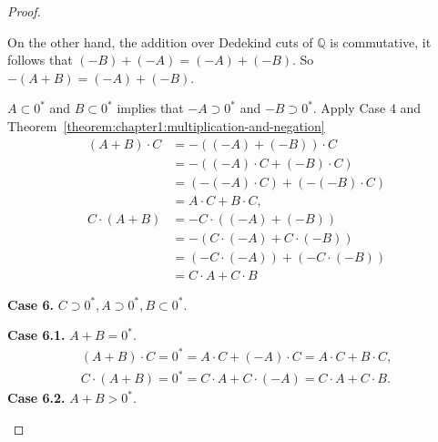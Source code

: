 \begin{proof}
\begin{enumerate}[label={(F\arabic*)}, start=5]
              On the other hand, the addition over Dedekind cuts of $\mathbb{Q}$ is commutative, it follows that $(-B) + (-A) = (-A) + (-B)$. So $-(A + B) = (-A) + (-B)$.

              $A\subset {0}^{*}$ and $B\subset {0}^{*}$ implies that $-A\supset {0}^{*}$ and $-B\supset {0}^{*}$. Apply Case 4 and Theorem~\ref{theorem:chapter1:multiplication-and-negation}
              \begin{align*}
                  (A + B)\cdot C & = -((-A) + (-B))\cdot C           \\
                                 & = -((-A)\cdot C + (-B)\cdot C)    \\
                                 & = (-(-A)\cdot C) + (-(-B)\cdot C) \\
                                 & = A\cdot C + B\cdot C,            \\
                  C\cdot (A + B) & = -C\cdot ((-A) + (-B))           \\
                                 & = -(C\cdot (-A) + C\cdot (-B))    \\
                                 & = (-C\cdot (-A)) + (-C\cdot (-B)) \\
                                 & = C\cdot A + C\cdot B
              \end{align*}

              \textbf{Case 6.} $C\supset {0}^{*}, A\supset {0}^{*}, B\subset {0}^{*}$.

              \textbf{Case 6.1.} $A + B = {0}^{*}$.
              \[
                  \begin{split}
                      (A + B)\cdot C = {0}^{*} = A\cdot C + (-A)\cdot C = A\cdot C + B\cdot C, \\
                      C\cdot (A + B) = {0}^{*} = C\cdot A + C\cdot (-A) = C\cdot A + C\cdot B.
                  \end{split}
              \]
              \textbf{Case 6.2.} $A + B > {0}^{*}$.


\end{enumerate}
\end{proof}
